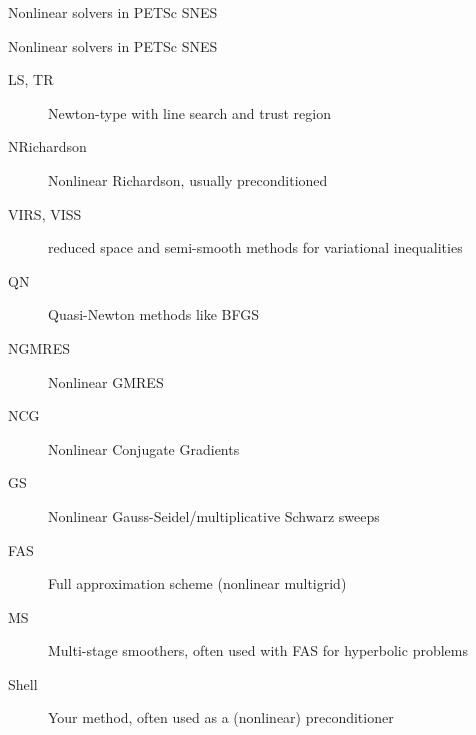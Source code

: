 \begin{frame}{Nonlinear solvers in PETSc SNES}
 \begin{block}{Nonlinear solvers in PETSc SNES}
  \begin{description}
  \item[LS, TR] Newton-type with line search and trust region
  \item[NRichardson] Nonlinear Richardson, usually preconditioned
  \item[VIRS, VISS] reduced space and semi-smooth methods for variational inequalities
  \item[QN] Quasi-Newton methods like BFGS
  \item[NGMRES] Nonlinear GMRES
  \item[NCG] Nonlinear Conjugate Gradients
  \item[GS] Nonlinear Gauss-Seidel/multiplicative Schwarz sweeps
  \item[FAS] Full approximation scheme (nonlinear multigrid)
  \item[MS] Multi-stage smoothers, often used with FAS for hyperbolic problems
  \item[Shell] Your method, often used as a (nonlinear) preconditioner
  \end{description}
 \end{block}
\end{frame}

